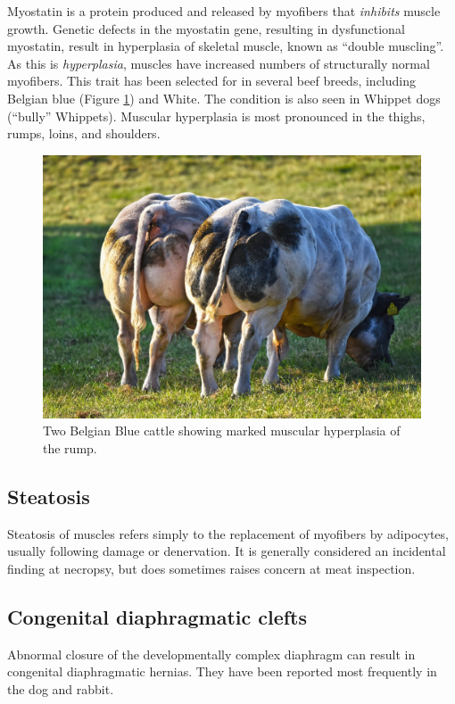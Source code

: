 \documentclass[openany]{book}
\begin{document}
Myostatin is a protein produced and released by myofibers that
\emph{inhibits} muscle growth. Genetic defects in the myostatin gene,
resulting in dysfunctional myostatin, result in hyperplasia of skeletal
muscle, known as ``double muscling''. As this is \emph{hyperplasia},
muscles have increased numbers of structurally normal myofibers. This
trait has been selected for in several beef breeds, including Belgian
blue (Figure \ref{fig:belgian-blue}) and White. The condition is also
seen in Whippet dogs (``bully'' Whippets). Muscular hyperplasia is most
pronounced in the thighs, rumps, loins, and shoulders.

\begin{figure}

{\centering \includegraphics[width=0.6\linewidth]{images/belgian-blue} 

}

\caption{Two Belgian Blue cattle showing marked muscular hyperplasia of the rump.}\label{fig:belgian-blue}
\end{figure}

\subsection{Steatosis}\label{steatosis}

Steatosis of muscles refers simply to the replacement of myofibers by
adipocytes, usually following damage or denervation. It is generally
considered an incidental finding at necropsy, but does sometimes raises
concern at meat inspection.

\subsection{Congenital diaphragmatic
clefts}\label{congenital-diaphragmatic-clefts}

Abnormal closure of the developmentally complex diaphragm can result in
congenital diaphragmatic hernias. They have been reported most
frequently in the dog and rabbit.
\end{document}
